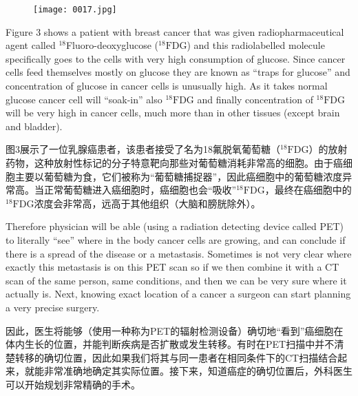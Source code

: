 \documentclass[dvipsnames, svgnames,a4paper,11pt]{article}
\begin{document}
\begin{figure}[htbp]
      \centering
      \texttt{[image: 0017.jpg]}
 \label{fig3}
  \end{figure}

Figure 3 shows a patient with breast cancer that was given radiopharmaceutical agent called ${}^{18}$Fluoro-deoxyglucose (${}^{18}\text{F}$DG) and this radiolabelled molecule specifically goes to the cells with very high consumption of glucose. Since cancer cells feed themselves mostly on glucose they are known as “traps for glucose” and concentration of glucose in cancer cells is unusually high. As it takes normal glucose cancer cell will “soak-in” also ${}^{18}\text{F}$DG and finally concentration of ${}^{18}\text{F}$DG will be very high in cancer cells, much more than in other tissues (except brain and bladder).

图3展示了一位乳腺癌患者，该患者接受了名为18氟脱氧葡萄糖（${}^{18}\text{F}$DG）的放射药物，这种放射性标记的分子特意靶向那些对葡萄糖消耗非常高的细胞。由于癌细胞主要以葡萄糖为食，它们被称为“葡萄糖捕捉器”，因此癌细胞中的葡萄糖浓度异常高。当正常葡萄糖进入癌细胞时，癌细胞也会“吸收”${}^{18}\text{F}$DG，最终在癌细胞中的${}^{18}\text{F}$DG浓度会非常高，远高于其他组织（大脑和膀胱除外）。

Therefore physician will be able (using a radiation detecting device called PET) to literally “see” where in the body cancer cells are growing, and can conclude if there is a spread of the disease or a metastasis. Sometimes is not very clear where exactly this metastasis is on this PET scan so if we then combine it with a CT scan of the same person, same conditions, and then we can be very sure where it actually is. Next, knowing exact location of a cancer a surgeon can start planning a very precise surgery.

因此，医生将能够（使用一种称为PET的辐射检测设备）确切地“看到”癌细胞在体内生长的位置，并能判断疾病是否扩散或发生转移。有时在PET扫描中并不清楚转移的确切位置，因此如果我们将其与同一患者在相同条件下的CT扫描结合起来，就能非常准确地确定其实际位置。接下来，知道癌症的确切位置后，外科医生可以开始规划非常精确的手术。
\end{document}

